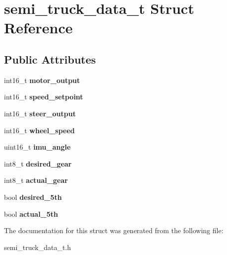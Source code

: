 \hypertarget{structsemi__truck__data__t}{}\section{semi\+\_\+truck\+\_\+data\+\_\+t Struct Reference}
\label{structsemi__truck__data__t}
\subsection*{Public Attributes}
\begin{DoxyCompactItemize}
\item 
int16\+\_\+t {\bfseries motor\+\_\+output}\hypertarget{structsemi__truck__data__t_a46e0447dfc05bdb8365a49c85cd8308a}{}\label{structsemi__truck__data__t_a46e0447dfc05bdb8365a49c85cd8308a}

\item 
int16\+\_\+t {\bfseries speed\+\_\+setpoint}\hypertarget{structsemi__truck__data__t_a91722cc338b550d6d5a681b96f9832e5}{}\label{structsemi__truck__data__t_a91722cc338b550d6d5a681b96f9832e5}

\item 
int16\+\_\+t {\bfseries steer\+\_\+output}\hypertarget{structsemi__truck__data__t_a3f2f9bce23b8dd12e762822df35b9e2a}{}\label{structsemi__truck__data__t_a3f2f9bce23b8dd12e762822df35b9e2a}

\item 
int16\+\_\+t {\bfseries wheel\+\_\+speed}\hypertarget{structsemi__truck__data__t_a1762d2a57fdd8227a075dfcde8c78792}{}\label{structsemi__truck__data__t_a1762d2a57fdd8227a075dfcde8c78792}

\item 
uint16\+\_\+t {\bfseries imu\+\_\+angle}\hypertarget{structsemi__truck__data__t_a2888636d9f8e14256c90620e1dadf248}{}\label{structsemi__truck__data__t_a2888636d9f8e14256c90620e1dadf248}

\item 
int8\+\_\+t {\bfseries desired\+\_\+gear}\hypertarget{structsemi__truck__data__t_a3b16a41a160ec9a1485a72e7a0d75eae}{}\label{structsemi__truck__data__t_a3b16a41a160ec9a1485a72e7a0d75eae}

\item 
int8\+\_\+t {\bfseries actual\+\_\+gear}\hypertarget{structsemi__truck__data__t_a20fae0780a4f2ee834aa80d256719fa0}{}\label{structsemi__truck__data__t_a20fae0780a4f2ee834aa80d256719fa0}

\item 
bool {\bfseries desired\+\_\+5th}\hypertarget{structsemi__truck__data__t_aac807941e27ca6fed40f846844bb5dbe}{}\label{structsemi__truck__data__t_aac807941e27ca6fed40f846844bb5dbe}

\item 
bool {\bfseries actual\+\_\+5th}\hypertarget{structsemi__truck__data__t_a08403624ba586700e633e81e5f4f3a5d}{}\label{structsemi__truck__data__t_a08403624ba586700e633e81e5f4f3a5d}

\end{DoxyCompactItemize}


The documentation for this struct was generated from the following file\+:\begin{DoxyCompactItemize}
\item 
semi\+\_\+truck\+\_\+data\+\_\+t.\+h\end{DoxyCompactItemize}
